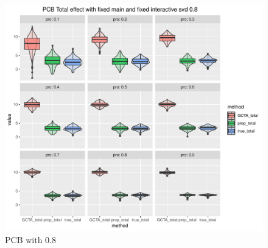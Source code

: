\documentclass[]{article}
\begin{document}
\begin{figure}
\centering
\includegraphics{./generate_graph_as_pdf/plot_PCB_fixed_fixed_pro_0.1_0.9_p_33_svd_0.8.pdf}
\caption{PCB with 0.8}
\end{figure}
\end{document}
